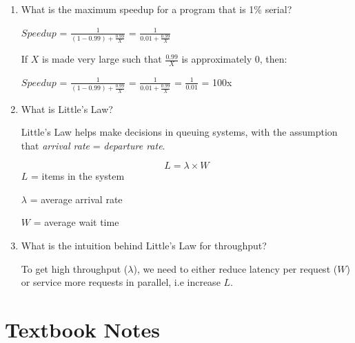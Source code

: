 \documentclass[12pt]{article}
\newenvironment{QandA}{\begin{enumerate}[label=\bfseries\alph*.]\bfseries}
                      {\end{enumerate}}
\newenvironment{answered}{\par\quad\normalfont}{}
\begin{document}
\begin{QandA}
\begin{answered}
        $Speedup$ = $\frac{1}{(1-0.9) + \frac{0.9}{X}}$ = $\frac{1}{0.1 + \frac{0.9}{X}}$ = $\frac{1}{0.1}$ = 10x
        \end{answered}

    \item What is the maximum speedup for a program that is 1\% serial?
        \begin{answered}
        $Speedup$ = $\frac{1}{(1-0.99) + \frac{0.99}{X}}$ = $\frac{1}{0.01 + \frac{0.99}{X}}$
        
        If $X$ is made very large such that $\frac{0.99}{X}$ is approximately $0$, then:
        
        $Speedup$ = $\frac{1}{(1-0.99) + \frac{0.99}{X}}$ = $\frac{1}{0.01 + \frac{0.99}{X}}$ = $\frac{1}{0.01}$ = 100x
        \end{answered}
        
    \item What is Little's Law?
        \begin{answered}
        Little's Law helps make decisions in queuing systems, with the assumption that \textit{arrival rate} = \textit{departure rate}.
        
        \begin{equation}
            L = \lambda \times W
        \end{equation}
        $L$ = items in the system
        
        $\lambda$ = average arrival rate
        
        $W$ = average wait time 
        \end{answered}
    
    \item What is the intuition behind Little's Law for throughput?
        \begin{answered}
        To get high throughput ($\lambda$), we need to either reduce latency per request ($W$) or service more requests in parallel, i.e increase $L$.
        \end{answered}
\end{QandA}

\clearpage 

\section{Textbook Notes}
\end{document}
